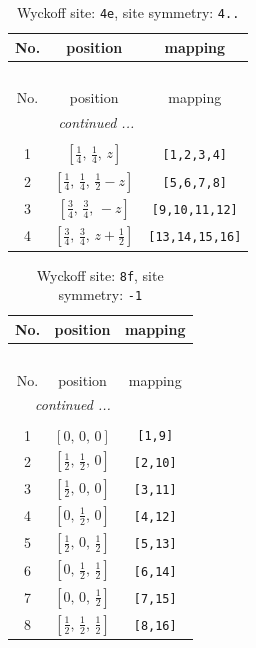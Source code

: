 \documentclass[fleqn,8pt]{jsarticle}
\begin{document}
\renewcommand{\arraystretch}{1.2}
\begin{longtable}{ccc}
\caption{Wyckoff site: {\tt 4e}, site symmetry: {\tt 4..}}
 \\
 \hline \hline
No. & position & mapping \\ \hline \endfirsthead

\multicolumn{2}{l}{\tablename\ \thetable{}} \\
 \hline \hline
No. & position & mapping \\ \hline \endhead

 \hline \hline
\multicolumn{2}{r}{\footnotesize\it continued ...} \\ \endfoot

 \hline \hline
\multicolumn{2}{r}{} \\ \endlastfoot

1 & $\left[ \frac{1}{4},\, \frac{1}{4},\, z \right]$ & {\tt [1,2,3,4]} \\ \hline
2 & $\left[ \frac{1}{4},\, \frac{1}{4},\, \frac{1}{2} - z \right]$ & {\tt [5,6,7,8]} \\ \hline
3 & $\left[ \frac{3}{4},\, \frac{3}{4},\, - z \right]$ & {\tt [9,10,11,12]} \\ \hline
4 & $\left[ \frac{3}{4},\, \frac{3}{4},\, z + \frac{1}{2} \right]$ & {\tt [13,14,15,16]} \\
\end{longtable}
\renewcommand{\arraystretch}{1.2}
\begin{longtable}{ccc}
\caption{Wyckoff site: {\tt 8f}, site symmetry: {\tt -1}}
 \\
 \hline \hline
No. & position & mapping \\ \hline \endfirsthead

\multicolumn{2}{l}{\tablename\ \thetable{}} \\
 \hline \hline
No. & position & mapping \\ \hline \endhead

 \hline \hline
\multicolumn{2}{r}{\footnotesize\it continued ...} \\ \endfoot

 \hline \hline
\multicolumn{2}{r}{} \\ \endlastfoot

1 & $\left[ 0,\, 0,\, 0 \right]$ & {\tt [1,9]} \\ \hline
2 & $\left[ \frac{1}{2},\, \frac{1}{2},\, 0 \right]$ & {\tt [2,10]} \\ \hline
3 & $\left[ \frac{1}{2},\, 0,\, 0 \right]$ & {\tt [3,11]} \\ \hline
4 & $\left[ 0,\, \frac{1}{2},\, 0 \right]$ & {\tt [4,12]} \\ \hline
5 & $\left[ \frac{1}{2},\, 0,\, \frac{1}{2} \right]$ & {\tt [5,13]} \\ \hline
6 & $\left[ 0,\, \frac{1}{2},\, \frac{1}{2} \right]$ & {\tt [6,14]} \\ \hline
7 & $\left[ 0,\, 0,\, \frac{1}{2} \right]$ & {\tt [7,15]} \\ \hline
8 & $\left[ \frac{1}{2},\, \frac{1}{2},\, \frac{1}{2} \right]$ & {\tt [8,16]} \\
\end{longtable}
\end{document}
